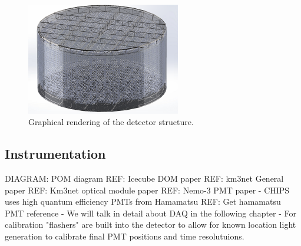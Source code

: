 \begin{figure} %
    \includegraphics[width=0.6\textwidth]{diagrams/5-chips/chips_render_2.png}
    \caption[Graphical rendering of the \chipsfive detector structure.]
    {Graphical rendering of the \chipsfive detector structure.}
    \label{fig:chips_render_2}
\end{figure}

\subsection{Instrumentation} %
\label{sec:chips_detector_instrumentation} %

DIAGRAM: POM diagram
REF: Icecube DOM paper
REF: km3net General paper
REF: Km3net optical module paper
REF: Nemo-3 PMT paper
- CHIPS uses high quantum efficiency PMTs from Hamamatsu
REF: Get hamamatsu PMT reference
- We will talk in detail about DAQ in the following chapter
- For calibration "flashers" are built into the detector to allow for known location light
generation to calibrate final PMT positions and time resolutuions.

